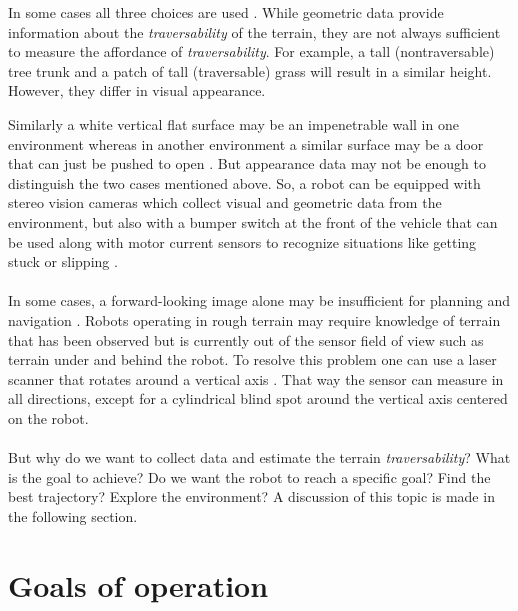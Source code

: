 \documentclass[12pt,a4paper]{report}
\newcommand{\term}{\textit}
\begin{document}
	In some cases all three choices are used \cite{Kim}. While geometric data 
	provide information about the \term{traversability} of the terrain, they are 
	not always sufficient to measure the affordance of \term{traversability}. For 
	example, a tall (nontraversable) tree trunk and a patch of tall (traversable) 
	grass will result in a similar height. However, they differ in visual 
	appearance. 
	\par 
	Similarly a white vertical flat surface may be an impenetrable wall in one 
	environment whereas in another environment a similar surface may be a door that 
	can just be pushed to open \cite{Ugur}. But appearance data may not be enough 
	to distinguish the two cases mentioned above. So, a robot can be equipped with 
	stereo vision cameras which collect visual and geometric data from the 
	environment, but also with a bumper switch at the front of the vehicle that can 
	be used along with motor current sensors to recognize situations like getting 
	stuck or slipping \cite{Kim}.
	\\\\
	
	
	In some cases, a forward-looking image alone may be insufficient for planning and 
	navigation \cite{Kweon}. Robots operating in rough terrain may require knowledge 
	of terrain that has been observed but is currently out of the sensor field of 
	view such as terrain under and behind the robot. To resolve this problem one can 
	use a laser scanner that rotates around a vertical axis \cite{Droeschel}. That 
	way the sensor can measure in all directions, except for a cylindrical blind spot 
	around the vertical axis centered on the robot.
	\\\\
	
	
	But why do we want to collect data and estimate the terrain \term{traversability}?
	What is the goal to achieve? Do we want the robot to reach a specific goal? Find 
	the best trajectory? Explore the environment? A discussion of this topic is made 
	in the following section.
	\\
	
	\section{Goals of operation}
	\label{sec:bg:goals}
	
\end{document}
